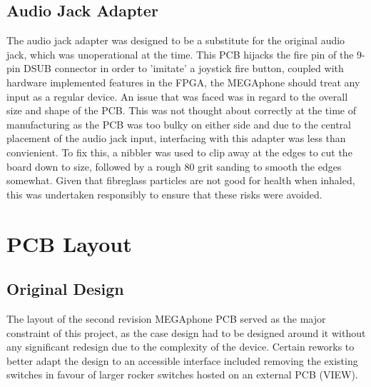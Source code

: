 \subsection{Audio Jack Adapter}

The audio jack adapter was designed to be a substitute for the original audio jack, which was unoperational at the time.
This PCB hijacks the fire pin of the 9-pin DSUB connector in order to 'imitate' a joystick fire button, coupled with hardware implemented features in the FPGA, the MEGAphone should treat any input as a regular device.
An issue that was faced was in regard to the overall size and shape of the PCB.
This was not thought about correctly at the time of manufacturing as the PCB was too bulky on either side and due to the central placement of the audio jack input, interfacing with this adapter was less than convienient.
To fix this, a nibbler was used to clip away at the edges to cut the board down to size, followed by a rough 80 grit sanding to smooth the edges somewhat.
Given that fibreglass particles are not good for health when inhaled, this was undertaken responsibly to ensure that these risks were avoided.


\section{PCB Layout}


\subsection{Original Design}

The layout of the second revision MEGAphone PCB served as the major constraint of this project, as the case design had to be designed around it without any significant redesign due to the complexity of the device. Certain reworks to better adapt the design to an accessible interface included removing the existing switches in favour of larger rocker switches hosted on an external PCB (VIEW).

